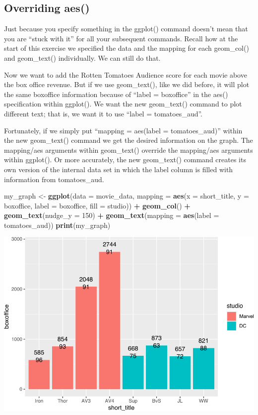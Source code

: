 \documentclass[
]{krantz}
\makeatletter
\newenvironment{Shaded}{\begin{snugshade}}{\end{snugshade}}
\newcommand{\DataTypeTok}[1]{\textcolor[rgb]{0.27,0.27,0.27}{#1}}
\newcommand{\DecValTok}[1]{\textcolor[rgb]{0.06,0.06,0.06}{#1}}
\newcommand{\KeywordTok}[1]{\textcolor[rgb]{0.27,0.27,0.27}{\textbf{#1}}}
\newcommand{\NormalTok}[1]{#1}
\newcommand{\OperatorTok}[1]{\textcolor[rgb]{0.43,0.43,0.43}{\textbf{#1}}}
\newcommand{\StringTok}[1]{\textcolor[rgb]{0.5,0.5,0.5}{#1}}
\newenvironment{kframe}{%
\medskip{}
\setlength{\fboxsep}{.8em}
 \def\at@end@of@kframe{}%
 \ifinner\ifhmode%
  \def\at@end@of@kframe{\end{minipage}}%
  \begin{minipage}{\columnwidth}%
 \fi\fi%
 \def\FrameCommand##1{\hskip\@totalleftmargin \hskip-\fboxsep
 \colorbox{shadecolor}{##1}\hskip-\fboxsep
     \hskip-\linewidth \hskip-\@totalleftmargin \hskip\columnwidth}%
 \MakeFramed {\advance\hsize-\width
   \@totalleftmargin\z@ \linewidth\hsize
   \@setminipage}}%
 {\par\unskip\endMakeFramed%
 \at@end@of@kframe}
\renewenvironment{Shaded}{\begin{kframe}}{\end{kframe}}
\makeatother
\begin{document}
\hypertarget{overriding-aes}{%
\subsection{Overriding aes()}\label{overriding-aes}}

Just because you specify something in the ggplot() command doesn't mean that you are ``stuck with it'' for all your subsequent commands. Recall how at the start of this exercise we specified the data and the mapping for each geom\_col() and geom\_text() individually. We can still do that.

Now we want to add the Rotten Tomatoes Audience score for each movie above the box office revenue. But if we use geom\_text(), like we did before, it will plot the same boxoffice information because of ``label = boxoffice'' in the aes() specification within ggplot(). We want the new geom\_text() command to plot different text; that is, we want it to use ``label = tomatoes\_aud''.

Fortunately, if we simply put ``mapping = aes(label = tomatoes\_aud)'' within the new geom\_text() command we get the desired information on the graph. The mapping/aes arguments within geom\_text() override the mapping/aes arguments within ggplot(). Or more accurately, the new geom\_text() command creates its own version of the internal data set in which the label column is filled with information from tomatoes\_aud.

\begin{Shaded}
\begin{Highlighting}[]
\NormalTok{my_graph <-}\StringTok{ }\KeywordTok{ggplot}\NormalTok{(}\DataTypeTok{data =}\NormalTok{ movie_data,}
           \DataTypeTok{mapping =} \KeywordTok{aes}\NormalTok{(}\DataTypeTok{x =}\NormalTok{ short_title,}
                         \DataTypeTok{y =}\NormalTok{ boxoffice,}
                         \DataTypeTok{label =}\NormalTok{ boxoffice, }
                         \DataTypeTok{fill =}\NormalTok{ studio)) }\OperatorTok{+}
\StringTok{  }\KeywordTok{geom_col}\NormalTok{() }\OperatorTok{+}
\StringTok{  }\KeywordTok{geom_text}\NormalTok{(}\DataTypeTok{nudge_y =} \DecValTok{150}\NormalTok{)  }\OperatorTok{+}
\StringTok{  }\KeywordTok{geom_text}\NormalTok{(}\DataTypeTok{mapping =} \KeywordTok{aes}\NormalTok{(}\DataTypeTok{label =}\NormalTok{ tomatoes_aud)) }
\KeywordTok{print}\NormalTok{(my_graph)}
\end{Highlighting}
\end{Shaded}

\includegraphics[width=0.65\linewidth]{bookdown_files/figure-latex/unnamed-chunk-266-1}
\end{document}
